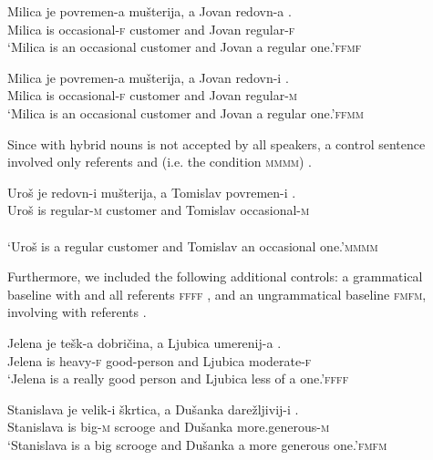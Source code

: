 \documentclass[output=paper,modfonts,newtxmath,hidelinks]{langscibook}
\begin{document}
  		\ea \gll Milica je povremen{-a} mušterija, a Jovan redovn{-a} \underline{\hspace{1.5cm}}.\\
  		Milica is occasional{-\textsc{f}} customer and Jovan regular{-\textsc{f}}\\
  		\glt `Milica is an occasional customer and Jovan a regular one.'\hfill  \textsc{ffmf}\label{14:ex12}
        \z
  		
  		\ea \gll Milica je povremen{-a} mušterija, a Jovan redovn{-i} \underline{\hspace{1.5cm}}.\\
  		Milica is occasional{-\textsc{f}} customer and Jovan regular{-\textsc{m}}\\
  		\glt `Milica is an occasional customer and Jovan a regular one.'\hfill \textsc{ffmm}\label{14:ex13}
        \z
  		
\noindent Since   with hybrid nouns is not accepted by all speakers, a control sentence involved only  referents and  (i.e. the condition \textsc{mmmm}) .

		\ea \gll Uroš je redovn{-i} mušterija, a Tomislav povremen{-i} \underline{\hspace{1.5cm}}.\\
  			Uroš is regular{-\textsc{m}} customer and Tomislav occasional{-\textsc{m}}\\ \\
  			\glt `Uroš is a regular customer and Tomislav an occasional one.'\hfill \textsc{mmmm}\label{14:ex14}
            \z
     

\noindent Furthermore, we included the following additional controls: a grammatical baseline with   and all  referents \textsc{ffff} , and an ungrammatical baseline \textsc{fmfm}, involving   with  referents . 

  			\ea \gll Jelena je tešk{-a} dobričina, a Ljubica umerenij{-a} \underline{\hspace{1.5cm}}.\\
  			Jelena is heavy{-\textsc{f}} good-person and Ljubica moderate{-\textsc{f}}\\
  			\glt `Jelena is a really good person and Ljubica less of a one.'\hfill  \textsc{ffff}\label{14:ex15}
            \z
			
  			\ea \gll Stanislava je velik{-i} škrtica, a Dušanka darežljivij{-i} \underline{\hspace{1.5cm}}.\\
  			Stanislava is big{-\textsc{m}} scrooge and Dušanka more.generous{-\textsc{m}}\\
  			\glt `Stanislava is a big scrooge and Dušanka a more generous one.'\hfill  \textsc{fmfm}\label{14:ex16}
            \z
\end{document}
